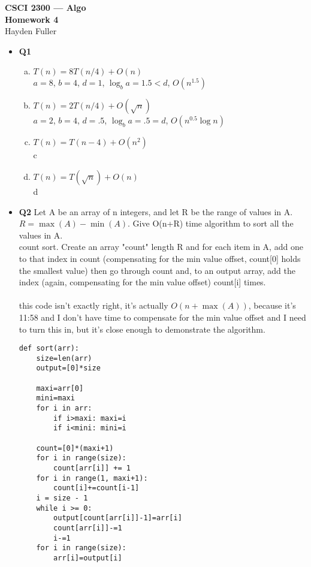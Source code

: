 \documentclass[11pt]{article}
\begin{document}
\thispagestyle{empty}   %

\begin{center}
\large
\textbf{CSCI 2300 --- Algo \\
Homework 4}
\\Hayden Fuller
\end{center}

\begin{itemize}

\item \textbf{Q1} 
\begin{enumerate}[(a)]
\item $T(n) = 8T(n/4)+O(n)$
\\ $a=8$, $b=4$, $d=1$, $\log_b a=1.5 < d$, $O(n^{1.5})$
\item $T(n) = 2T(n/4)+O(\sqrt{n})$
\\ $a=2$, $b=4$, $d=.5$, $\log_b a=.5 = d$, $O(n^{0.5}\log n)$
\item $T(n) = T(n-4)+O(n^2)$
\\c
\item $T(n) = T(\sqrt{n})+O(n)$
\\d
\end{enumerate}

\vspace{0.1in}

\item \textbf{Q2} 
Let A be an array of n integers, and let R be the range of values in A.  $R=\max(A)-\min(A)$. Give O(n+R) time algorithm to sort all the values in A. 
\\count sort. Create an array "count" length R and for each item in A, add one to that index in count (compensating for the min value offset, count[0] holds the smallest value) then go through count and, to an output array, add the index (again, compensating for the min value offset) count[i] times.
\\
\\this code isn't exactly right, it's actually $O(n+\max(A))$, because it's 11:58 and I don't have time to compensate for the min value offset and I need to turn this in, but it's close enough to demonstrate the algorithm.
\begin{verbatim}
def sort(arr):
    size=len(arr)
    output=[0]*size

    maxi=arr[0]
    mini=maxi
    for i in arr:
        if i>maxi: maxi=i
        if i<mini: mini=i

    count=[0]*(maxi+1)
    for i in range(size):
        count[arr[i]] += 1
    for i in range(1, maxi+1):
        count[i]+=count[i-1]
    i = size - 1
    while i >= 0:
        output[count[arr[i]]-1]=arr[i]
        count[arr[i]]-=1
        i-=1
    for i in range(size):
        arr[i]=output[i]
\end{verbatim}


\end{itemize}
\end{document}
